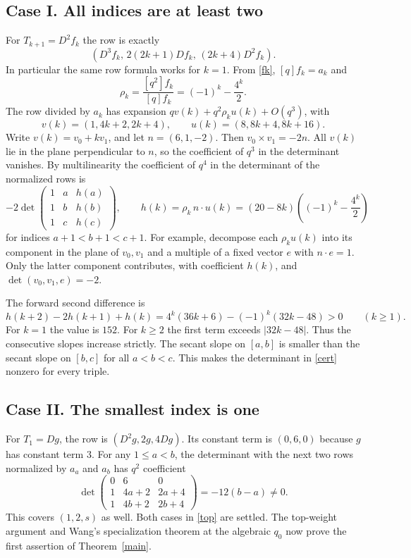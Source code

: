 \documentclass[11pt]{article}
\begin{document}
\subsection*{Case I. All indices are at least two}
For $T_{k+1}=D^2 f_k$ the row is exactly
\[
 (D^3 f_k,\,2(2k+1)Df_k,\,(2k+4)D^2 f_k).
\]
In particular the same row formula works for $k=1$. From \eqref{fk}, $[q]f_k=a_k$ and
\[
 \rho_k=\frac{[q^2]f_k}{[q]f_k}=(-1)^k-\frac{4^k}{2}.
\]
The row divided by $a_k$ has expansion $qv(k)+q^2\rho_k u(k)+O(q^3)$, with
\[
 v(k)=(1,4k+2,2k+4),\qquad u(k)=(8,8k+4,8k+16).
\]
Write $v(k)=v_0+kv_1$, and let $n=(6,1,-2)$. Then $v_0\times v_1=-2n$. All $v(k)$ lie in the plane perpendicular to $n$, so the coefficient of $q^3$ in the determinant vanishes. By multilinearity the coefficient of $q^4$ in the determinant of the normalized rows is
\begin{equation}\label{cert}
 -2\det\begin{pmatrix}
 1&a&h(a)\\1&b&h(b)\\1&c&h(c)
 \end{pmatrix},\qquad h(k)=\rho_k\, n\!\cdot\!u(k)=(20-8k)\left((-1)^k-\frac{4^k}{2}\right)
\end{equation}
for indices $a+1<b+1<c+1$. For example, decompose each $\rho_k u(k)$ into its component in the plane of $v_0,v_1$ and a multiple of a fixed vector $e$ with $n\cdot e=1$. Only the latter component contributes, with coefficient $h(k)$, and $\det(v_0,v_1,e)=-2$.

The forward second difference is
\[
 h(k+2)-2h(k+1)+h(k)
 =4^k(36k+6)-(-1)^k(32k-48)>0\qquad(k\ge1).
\]
For $k=1$ the value is $152$. For $k\ge2$ the first term exceeds $|32k-48|$. Thus the consecutive slopes increase strictly. The secant slope on $[a,b]$ is smaller than the secant slope on $[b,c]$ for all $a<b<c$. This makes the determinant in \eqref{cert} nonzero for every triple.

\clearpage
\subsection*{Case II. The smallest index is one}
For $T_1=Dg$, the row is $(D^2g,2g,4Dg)$. Its constant term is $(0,6,0)$ because $g$ has constant term $3$. For any $1\le a<b$, the determinant with the next two rows normalized by $a_a$ and $a_b$ has $q^2$ coefficient
\[
 \det\begin{pmatrix}
 0&6&0\\1&4a+2&2a+4\\1&4b+2&2b+4
 \end{pmatrix}=-12(b-a)\ne0.
\]
This covers $(1,2,s)$ as well. Both cases in \eqref{top} are settled. The top-weight argument and Wang's specialization theorem at the algebraic $q_0$ now prove the first assertion of Theorem~\ref{main}.
\end{document}
